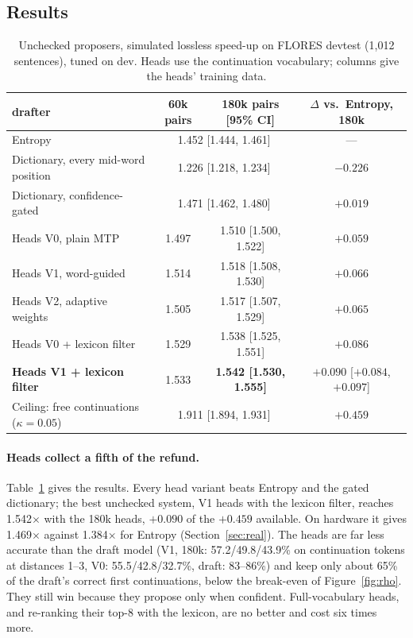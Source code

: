 \documentclass[11pt]{article}
\newcommand{\x}{$\times$}
\begin{document}
\subsection{Results}
\label{sec:results}

\begin{table}[t]
\centering
\small
\begin{tabular}{lccc}
\toprule
drafter & 60k pairs & 180k pairs [95\% CI] & $\Delta$ vs.\ Entropy, 180k \\
\midrule
Entropy & \multicolumn{2}{c}{1.452 [1.444, 1.461]} & --- \\
Dictionary, every mid-word position & \multicolumn{2}{c}{1.226 [1.218, 1.234]} & $-0.226$ \\
Dictionary, confidence-gated & \multicolumn{2}{c}{1.471 [1.462, 1.480]} & $+0.019$ \\
\midrule
Heads V0, plain MTP & 1.497 & 1.510 [1.500, 1.522] & $+0.059$ \\
Heads V1, word-guided & 1.514 & 1.518 [1.508, 1.530] & $+0.066$ \\
Heads V2, adaptive weights & 1.505 & 1.517 [1.507, 1.529] & $+0.065$ \\
Heads V0 + lexicon filter & 1.529 & 1.538 [1.525, 1.551] & $+0.086$ \\
\textbf{Heads V1 + lexicon filter} & 1.533 & \textbf{1.542 [1.530, 1.555]} & $\mathbf{+0.090}$ [$+0.084$, $+0.097$] \\
\midrule
Ceiling: free continuations ($\kappa=0.05$) & \multicolumn{2}{c}{1.911 [1.894, 1.931]} & $+0.459$ \\
\bottomrule
\end{tabular}
\caption{Unchecked proposers, simulated lossless speed-up on FLORES devtest (1{,}012 sentences),
tuned on dev. Heads use the continuation vocabulary; columns give the heads' training data.}
\label{tab:main}
\end{table}

\paragraph{Heads collect a fifth of the refund.} Table~\ref{tab:main} gives the results. Every head
variant beats Entropy and the gated dictionary; the best unchecked system, V1 heads with the lexicon
filter, reaches 1.542\x{} with the 180k heads, $+0.090$ of the $+0.459$ available. On hardware it gives
1.469\x{} against 1.384\x{} for Entropy (Section~\ref{sec:real}). The heads are far less accurate than
the draft model (V1, 180k: 57.2/49.8/43.9\% on continuation tokens at distances 1--3, V0:
55.5/42.8/32.7\%, draft: 83--86\%) and keep only about 65\% of the draft's correct first continuations,
below the break-even of Figure~\ref{fig:rho}. They still win because they propose only when confident.
Full-vocabulary heads, and re-ranking their top-8 with the lexicon, are no better and cost six times more.
\end{document}
